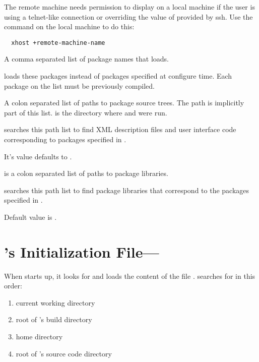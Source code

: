 \begin{description}
  The remote machine needs permission to display on
  a local machine if the user is using a telnet-like connection or overriding the value of    provided by ssh.
  Use the  command on the local machine to do
  this:

\begin{verbatim}
  xhost +remote-machine-name
\end{verbatim}
  
   A comma separated list of package names that
  \sr{} loads.
  
  \sr{} loads these packages instead of packages specified at
  configure time. Each package on the list must be previously
  compiled.
  
   A colon separated list of paths to
  package source trees.  The path
   is implicitly part of this
  list.   is the directory where
   and  were run.
  
  \sr{} searches this path list to find XML description files and
  user interface code corresponding to packages
  specified in .
  
  It's value defaults to .
  
    is a colon
  separated list of paths to package libraries.
  
  \sr{} searches this path list to find package libraries
  that correspond to the packages specified in
  .
  
  Default value is .

  
\end{description}

\section{\sr{}'s Initialization File---}
\label{sec:scirunrc}

When \sr{} starts up, it looks for and
loads the content of the file .  \sr{} searches for
 in this order:

\begin{enumerate}
\item current working directory
\item root of \sr's build directory
\item home directory
\item root of \sr's source code directory
\end{enumerate}

